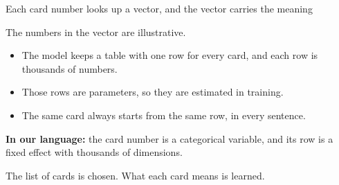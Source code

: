 \documentclass[aspectratio=169,11pt]{beamer}
\begin{document}
\begin{frame}{Each card number looks up a vector, and the vector carries the meaning}

\begin{center}

\vspace{0.05cm}
{\scriptsize\color{warmgray}The numbers in the vector are illustrative.}
\end{center}

\vspace{0.05cm}

\begin{itemize}\setlength\itemsep{0.15em}
    \item The model keeps a table with one row for every card, and each row is thousands of numbers.
    \item Those rows are parameters, so they are estimated in training.
    \item The same card always starts from the same row, in every sentence.
\end{itemize}

\vspace{0.1cm}

\textbf{In our language:} the card number is a categorical variable, and its row is a fixed effect with thousands of dimensions.

\vspace{0.1cm}

\alert{The list of cards is chosen. What each card means is learned.}

\end{frame}
\end{document}
